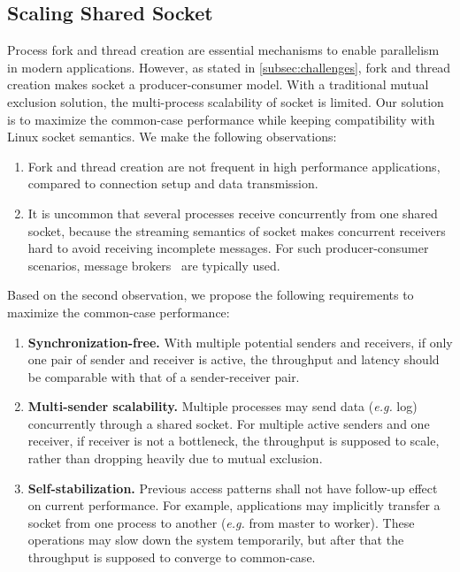 


\subsection{Scaling Shared Socket}
\label{subsec:fork}

Process fork and thread creation are essential mechanisms to enable parallelism in modern applications. 
However, as stated in \ref{subsec:challenges}, fork and thread creation makes socket a producer-consumer model. With a traditional mutual exclusion solution, the multi-process scalability of socket is limited. Our solution is to maximize the common-case performance while keeping compatibility with Linux socket semantics.
We make the following observations:
\begin{enumerate}
	\item Fork and thread creation are not frequent in high performance applications, compared to connection setup and data transmission.
	\item It is uncommon that several processes receive concurrently from one shared socket, because the streaming semantics of socket makes concurrent receivers hard to avoid receiving incomplete messages. For such producer-consumer scenarios, message brokers~\cite{hintjens2013zeromq,rabbitmq2017rabbitmq,kreps2011kafka} are typically used.
\end{enumerate}

Based on the second observation, we propose the following requirements to maximize the common-case performance:
\begin{enumerate}
 \item \textbf{Synchronization-free.} With multiple potential senders and receivers, if only one pair of sender and receiver is active, the throughput and latency should be comparable with that of a sender-receiver pair.
 \item \textbf{Multi-sender scalability.} Multiple processes may send data (\textit{e.g.} log) concurrently through a shared socket. For multiple active senders and one receiver, if receiver is not a bottleneck, the throughput is supposed to scale, rather than dropping heavily due to mutual exclusion.
 \item \textbf{Self-stabilization.} Previous access patterns shall not have follow-up effect on current performance. For example, applications may implicitly transfer a socket from one process to another (\textit{e.g.} from master to worker). These operations may slow down the system temporarily, but after that the throughput is supposed to converge to common-case.
\end{enumerate}


